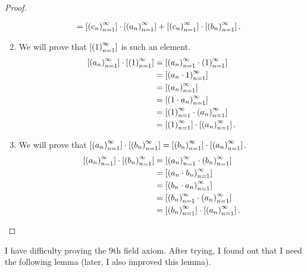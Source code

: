\begin{proof}
\begin{enumerate}[label={(F\arabic*)},itemsep=0pt,start=5]
\begin{align*}
                                                                                                 & = \left[{{\left({c_{n}}\right)}^{\infty}_{n=1}}\right]\cdot\left[{{\left({a_{n}}\right)}^{\infty}_{n=1}}\right] + \left[{{\left({c_{n}}\right)}^{\infty}_{n=1}}\right]\cdot\left[{{\left({b_{n}}\right)}^{\infty}_{n=1}}\right].
              \end{align*}
        \item We will prove that $\left[{{\left({1}\right)}^{\infty}_{n=1}}\right]$ is such an element.
              \begin{align*}
                  \left[{{\left({a_{n}}\right)}^{\infty}_{n=1}}\right]\cdot\left[{{\left({1}\right)}^{\infty}_{n=1}}\right] & = \left[{{\left({a_{n}}\right)}^{\infty}_{n=1}\cdot{\left({1}\right)}^{\infty}_{n=1}}\right]          \\
                                                          & = \left[{{\left({a_{n}\cdot 1}\right)}^{\infty}_{n=1}}\right]               \\
                                                          & = \left[{{\left({a_{n}}\right)}^{\infty}_{n=1}}\right]                      \\
                                                          & = \left[{{\left({1\cdot a_{n}}\right)}^{\infty}_{n=1}}\right]               \\
                                                          & = \left[{{\left({1}\right)}^{\infty}_{n=1}\cdot{\left({a_{n}}\right)}^{\infty}_{n=1}}\right]          \\
                                                          & = \left[{{\left({1}\right)}^{\infty}_{n=1}}\right]\cdot\left[{{\left({a_{n}}\right)}^{\infty}_{n=1}}\right].
              \end{align*}
        \item We will prove that $\left[{{\left({a_{n}}\right)}^{\infty}_{n=1}}\right]\cdot\left[{{\left({b_{n}}\right)}^{\infty}_{n=1}}\right] = \left[{{\left({b_{n}}\right)}^{\infty}_{n=1}}\right]\cdot\left[{{\left({a_{n}}\right)}^{\infty}_{n=1}}\right]$.
              \begin{align*}
                  \left[{{\left({a_{n}}\right)}^{\infty}_{n=1}}\right]\cdot\left[{{\left({b_{n}}\right)}^{\infty}_{n=1}}\right] & = \left[{{\left({a_{n}}\right)}^{\infty}_{n=1}\cdot{\left({b_{n}}\right)}^{\infty}_{n=1}}\right]          \\
                                                              & = \left[{{\left({a_{n}\cdot b_{n}}\right)}^{\infty}_{n=1}}\right]               \\
                                                              & = \left[{{\left({b_{n}\cdot a_{n}}\right)}^{\infty}_{n=1}}\right]               \\
                                                              & = \left[{{\left({b_{n}}\right)}^{\infty}_{n=1}\cdot{\left({a_{n}}\right)}^{\infty}_{n=1}}\right]          \\
                                                              & = \left[{{\left({b_{n}}\right)}^{\infty}_{n=1}}\right]\cdot\left[{{\left({a_{n}}\right)}^{\infty}_{n=1}}\right].
              \end{align*}
    \end{enumerate}
\end{proof}

I have difficulty proving the 9th field axiom. After trying, I found out that I need the following lemma (later, I also improved this lemma).

